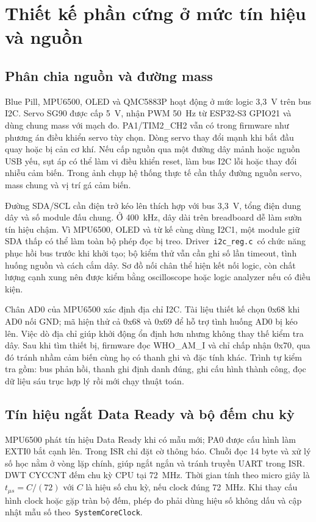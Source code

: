 \section{Thiết kế phần cứng ở mức tín hiệu và nguồn}
\subsection{Phân chia nguồn và đường mass}
Blue Pill, MPU6500, OLED và QMC5883P hoạt động ở mức logic 3,3~V trên bus I2C. Servo SG90 được cấp 5~V, nhận PWM 50~Hz từ ESP32-S3 GPIO21 và dùng chung mass với mạch đo. PA1/TIM2\_CH2 vẫn có trong firmware như phương án điều khiển servo tùy chọn. Dòng servo thay đổi mạnh khi bắt đầu quay hoặc bị cản cơ khí. Nếu cấp nguồn qua một đường dây mảnh hoặc nguồn USB yếu, sụt áp có thể làm vi điều khiển reset, làm bus I2C lỗi hoặc thay đổi nhiễu cảm biến. Trong ảnh chụp hệ thống thực tế cần thấy đường nguồn servo, mass chung và vị trí gá cảm biến.

Đường SDA/SCL cần điện trở kéo lên thích hợp với bus 3,3~V, tổng điện dung dây và số module đấu chung. Ở 400~kHz, dây dài trên breadboard dễ làm sườn tín hiệu chậm. Vì MPU6500, OLED và từ kế cùng dùng I2C1, một module giữ SDA thấp có thể làm toàn bộ phép đọc bị treo. Driver \,\texttt{i2c\_reg.c}\, có chức năng phục hồi bus trước khi khởi tạo; bộ kiểm thử vẫn cần ghi số lần timeout, tình huống nguồn và cách cắm dây. Sơ đồ nối chân thể hiện kết nối logic, còn chất lượng cạnh xung nên được kiểm bằng oscilloscope hoặc logic analyzer nếu có điều kiện.

Chân AD0 của MPU6500 xác định địa chỉ I2C. Tài liệu thiết kế chọn 0x68 khi AD0 nối GND; mã hiện thử cả 0x68 và 0x69 để hỗ trợ tình huống AD0 bị kéo lên. Việc dò địa chỉ giúp khởi động ổn định hơn nhưng không thay thế kiểm tra dây. Sau khi tìm thiết bị, firmware đọc WHO\_AM\_I và chỉ chấp nhận 0x70, qua đó tránh nhầm cảm biến cùng họ có thanh ghi và đặc tính khác. Trình tự kiểm tra gồm: bus phản hồi, thanh ghi định danh đúng, ghi cấu hình thành công, đọc dữ liệu sáu trục hợp lý rồi mới chạy thuật toán.

\subsection{Tín hiệu ngắt Data Ready và bộ đếm chu kỳ}
MPU6500 phát tín hiệu Data Ready khi có mẫu mới; PA0 được cấu hình làm EXTI0 bắt cạnh lên. Trong ISR chỉ đặt cờ thông báo. Chuỗi đọc 14 byte và xử lý số học nằm ở vòng lặp chính, giúp ngắt ngắn và tránh truyền UART trong ISR. DWT CYCCNT đếm chu kỳ CPU tại 72~MHz. Thời gian tính theo micro giây là $t_{\mu s}=C/(72)$ với $C$ là hiệu số chu kỳ, nếu clock đúng 72~MHz. Khi thay cấu hình clock hoặc gặp tràn bộ đếm, phép đo phải dùng hiệu số không dấu và cập nhật mẫu số theo \,\texttt{SystemCoreClock}.

